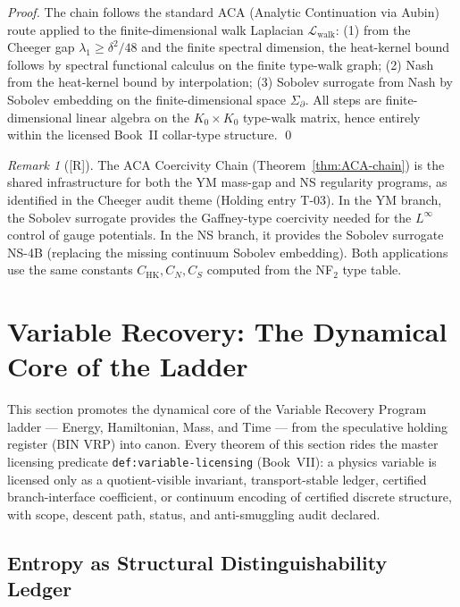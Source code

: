 \documentclass[12pt,oneside]{amsbook}
\theoremstyle{plain}
\theoremstyle{definition}
\theoremstyle{remark}
\newtheorem{remark}[theorem]{Remark}
\newcommand{\status}[1]{\textup{[#1]}}
\begin{document}
\begin{proof}
The chain follows the standard ACA (Analytic Continuation via
Aubin) route applied to the finite-dimensional walk Laplacian
$\mathcal{L}_{\mathrm{walk}}$:
(1) from the Cheeger gap $\lambda_1 \geq \delta^2/48$ and the
finite spectral dimension, the heat-kernel bound follows by
spectral functional calculus on the finite type-walk graph;
(2) Nash from the heat-kernel bound by interpolation;
(3) Sobolev surrogate from Nash by Sobolev embedding on the
finite-dimensional space $\Sigma_\partial$.
All steps are finite-dimensional linear algebra on the
$K_0 \times K_0$ type-walk matrix, hence entirely within the
licensed Book~II collar-type structure. \qed
\end{proof}

\begin{remark}[\status{R}]
The ACA Coercivity Chain (Theorem~\ref{thm:ACA-chain}) is the
shared infrastructure for both the YM mass-gap and NS
regularity programs, as identified in the Cheeger audit theme
(Holding entry T-03).  In the YM branch, the Sobolev surrogate
provides the Gaffney-type coercivity needed for the
$L^\infty$ control of gauge potentials.  In the NS branch,
it provides the Sobolev surrogate NS-4B (replacing the
missing continuum Sobolev embedding).  Both applications use
the same constants $C_{\mathrm{HK}}, C_N, C_S$ computed from
the NF$_2$ type table.
\end{remark}

\section{Variable Recovery: The Dynamical Core of the Ladder}
\label{sec:vrp-energy}

This section promotes the dynamical core of the Variable Recovery
Program ladder --- Energy, Hamiltonian, Mass, and Time --- from the
speculative holding register (BIN VRP) into canon.  Every theorem
of this section rides the master licensing predicate
\texttt{def:variable-licensing} (Book~VII): a physics variable is
licensed only as a quotient-visible invariant, transport-stable
ledger, certified branch-interface coefficient, or continuum
encoding of certified discrete structure, with scope, descent
path, status, and anti-smuggling audit declared.

\subsection{Entropy as Structural Distinguishability Ledger}
\label{sec:vrp-entropy}
\end{document}

